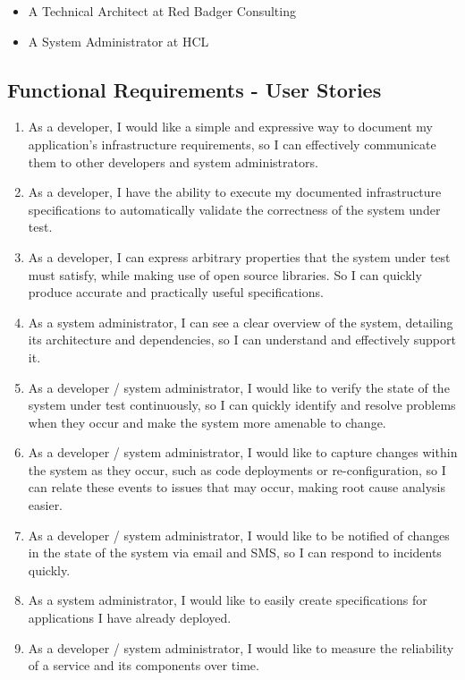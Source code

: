 \documentclass{cshonours}
\begin{document}
\begin{itemize}
  \item A Technical Architect at Red Badger Consulting
  \item A System Administrator at HCL
\end{itemize}

\subsection{Functional Requirements - User Stories}
\begin{enumerate}
  \item As a developer, I would like a simple and expressive way to document my application's infrastructure requirements, so I can effectively communicate them to other developers and system administrators.
  \item As a developer, I have the ability to execute my documented infrastructure specifications to automatically validate the correctness of the system under test.
  \item As a developer, I can express arbitrary properties that the system under test must satisfy, while making use of open source libraries. So I can quickly produce accurate and practically useful specifications.
  \item As a system administrator, I can see a clear overview of the system, detailing its architecture and dependencies, so I can understand and effectively support it.
  \item As a developer / system administrator, I would like to verify the state of the system under test continuously, so I can quickly identify and resolve problems when they occur and make the system more amenable to change.
  \item As a developer / system administrator, I would like to capture changes within the system as they occur, such as code deployments or re-configuration, so I can relate these events to issues that may occur, making root cause analysis easier.
  \item As a developer / system administrator, I would like to be notified of changes in the state of the system via email and SMS, so I can respond to incidents quickly.
  \item As a system administrator, I would like to easily create specifications for applications I have already deployed.
  \item As a developer / system administrator, I would like to measure the reliability of a service and its components over time.
\end{enumerate}
\end{document}

